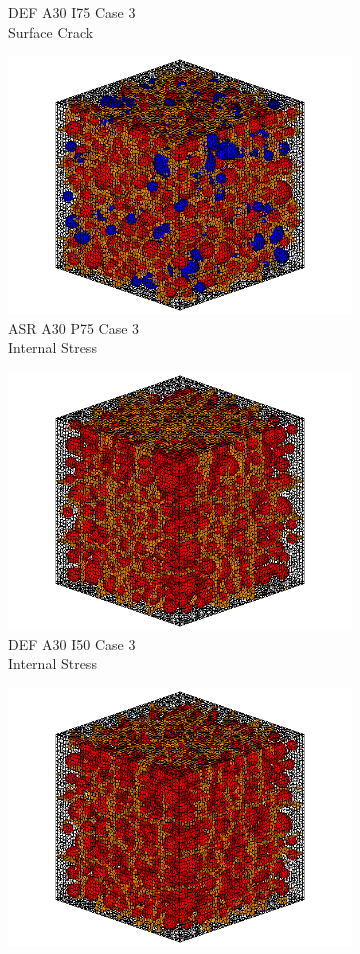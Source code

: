 \begin{figure}[ht!]
\begin{subfigure}{.33\textwidth}
      \caption{DEF A30 I75 Case 3 \\ Surface Crack}
    \end{subfigure}
    \begin{subfigure}{.33\textwidth}
      \centering
      \includegraphics[width=0.8\linewidth]{Files/exp_3D/ASR/A30P75_3_c.png}
      \caption{ASR A30 P75 Case 3 \\ Internal Stress}
    \end{subfigure}%
    \begin{subfigure}{.33\textwidth}
      \centering
      \includegraphics[width=0.8\linewidth]{Files/exp_3D/DEF/A30X0C_3_c.png}
      \caption{DEF A30 I50 Case 3 \\ Internal Stress}
    \end{subfigure}%
    \begin{subfigure}{.33\textwidth}
      \centering
      \includegraphics[width=0.8\linewidth]{Files/exp_3D/DEF/A30X-5C_3_c.png}

\end{subfigure}
\end{figure}

